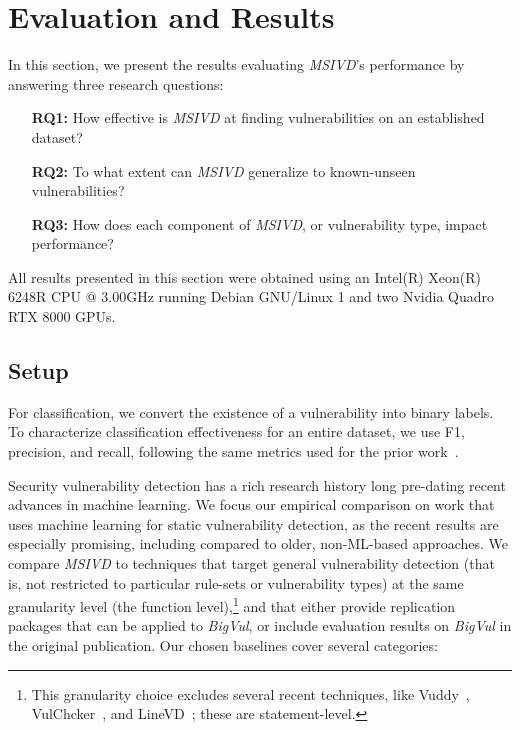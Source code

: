 \documentclass[12pt,openany,oneside,table]{cmuthesis}
\begin{document}
\section{Evaluation and Results}

In this section, we present the results evaluating \textit{MSIVD}'s performance by answering three research questions:


\begin{enumerate}[leftmargin=3em]
    \itemsep0em 
    \item[\textbf{RQ1:}] How effective is \textit{MSIVD} at finding vulnerabilities on an established dataset?
    \item[\textbf{RQ2:}] To what extent can \textit{MSIVD} generalize to known-unseen vulnerabilities?
    \item[\textbf{RQ3:}] How does each component of \textit{MSIVD}, or vulnerability type, impact performance?
\end{enumerate}
All results presented in this section were obtained using an Intel(R) Xeon(R) 6248R CPU @ 3.00GHz running Debian GNU/Linux 1 and two Nvidia Quadro RTX 8000 GPUs.


\subsection{Setup}
\label{sec:baselines}

For classification, we convert the existence of a vulnerability into binary labels. To characterize classification effectiveness for an entire
dataset, we use F1, precision, and recall, following the same metrics used for the prior work~\cite{deepdfa, ivdetect, linevul, vuldeepecker}.

Security vulnerability detection has a rich research history long pre-dating recent advances in machine learning.
We focus our empirical comparison on work that uses machine learning for static vulnerability detection, as the recent results are especially promising, including compared to older, non-ML-based approaches. 
We compare \textit{MSIVD} to techniques that target general vulnerability detection (that is, not restricted to particular rule-sets or vulnerability types) at the same granularity level (the function level),\footnote{This granularity choice excludes several recent techniques, like Vuddy~\cite{vuddy}, VulChcker~\cite{vulchecker}, and LineVD~\cite{linevd}; these are statement-level.} and that either provide replication packages that can be applied to \textit{BigVul}, or include evaluation results on \textit{BigVul} in the original publication.  
Our chosen baselines cover several categories:
\end{document}
